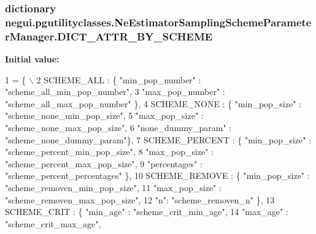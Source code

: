 \subsubsection[{\texorpdfstring{D\+I\+C\+T\+\_\+\+A\+T\+T\+R\+\_\+\+B\+Y\+\_\+\+S\+C\+H\+E\+ME}{DICT_ATTR_BY_SCHEME}}]{\setlength{\rightskip}{0pt plus 5cm}dictionary negui.\+pgutilityclasses.\+Ne\+Estimator\+Sampling\+Scheme\+Parameter\+Manager.\+D\+I\+C\+T\+\_\+\+A\+T\+T\+R\+\_\+\+B\+Y\+\_\+\+S\+C\+H\+E\+ME\hspace{0.3cm}{\ttfamily [static]}}\hypertarget{classnegui_1_1pgutilityclasses_1_1NeEstimatorSamplingSchemeParameterManager_a801ff644aa993145e0daff1fc38b1caa}{}\label{classnegui_1_1pgutilityclasses_1_1NeEstimatorSamplingSchemeParameterManager_a801ff644aa993145e0daff1fc38b1caa}
{\bfseries Initial value\+:}
\begin{DoxyCode}
1 = \{ \(\backslash\)
2                 SCHEME\_ALL : \{ \textcolor{stringliteral}{"min\_pop\_number"} : \textcolor{stringliteral}{"scheme\_all\_min\_pop\_number"},
3                             \textcolor{stringliteral}{"max\_pop\_number"} : \textcolor{stringliteral}{"scheme\_all\_max\_pop\_number"} \},
4                 SCHEME\_NONE : \{ \textcolor{stringliteral}{"min\_pop\_size"} : \textcolor{stringliteral}{"scheme\_none\_min\_pop\_size"},
5                                 \textcolor{stringliteral}{"max\_pop\_size"} : \textcolor{stringliteral}{"scheme\_none\_max\_pop\_size"},
6                                 \textcolor{stringliteral}{"none\_dummy\_param"} : \textcolor{stringliteral}{"scheme\_none\_dummy\_param"}\},
7                 SCHEME\_PERCENT : \{ \textcolor{stringliteral}{"min\_pop\_size"} : \textcolor{stringliteral}{"scheme\_percent\_min\_pop\_size"},
8                                     \textcolor{stringliteral}{"max\_pop\_size"} : \textcolor{stringliteral}{"scheme\_percent\_max\_pop\_size"},
9                                     \textcolor{stringliteral}{"percentages"} : \textcolor{stringliteral}{"scheme\_percent\_percentages"} \},
10                 SCHEME\_REMOVE : \{ \textcolor{stringliteral}{"min\_pop\_size"} : \textcolor{stringliteral}{"scheme\_removen\_min\_pop\_size"},
11                                     \textcolor{stringliteral}{"max\_pop\_size"} : \textcolor{stringliteral}{"scheme\_removen\_max\_pop\_size"},
12                                      \textcolor{stringliteral}{"n"}: \textcolor{stringliteral}{"scheme\_removen\_n"} \},
13                 SCHEME\_CRIT : \{ \textcolor{stringliteral}{"min\_age"} : \textcolor{stringliteral}{"scheme\_crit\_min\_age"}, 
14                             \textcolor{stringliteral}{"max\_age"} : \textcolor{stringliteral}{"scheme\_crit\_max\_age"},

\end{DoxyCode}
